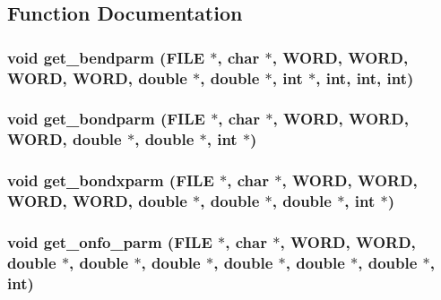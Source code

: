 \subsection{Function Documentation}
\subsubsection{\setlength{\rightskip}{0pt plus 5cm}void get\_\-bendparm (FILE $\ast$, char $\ast$, {\bf WORD}, {\bf WORD}, {\bf WORD}, {\bf WORD}, double $\ast$, double $\ast$, int $\ast$, int, int, int)}\label{thomas_2proto__input_8h_d1a60cb4dcaf05428bf12fd400393c24}


\subsubsection{\setlength{\rightskip}{0pt plus 5cm}void get\_\-bondparm (FILE $\ast$, char $\ast$, {\bf WORD}, {\bf WORD}, {\bf WORD}, double $\ast$, double $\ast$, int $\ast$)}\label{thomas_2proto__input_8h_e2f3fe34d49d48f8fea625df9d06766a}


\subsubsection{\setlength{\rightskip}{0pt plus 5cm}void get\_\-bondxparm (FILE $\ast$, char $\ast$, {\bf WORD}, {\bf WORD}, {\bf WORD}, {\bf WORD}, double $\ast$, double $\ast$, double $\ast$, int $\ast$)}\label{thomas_2proto__input_8h_4c20c39b2381ac59d1bb4acf0a4d9475}


\subsubsection{\setlength{\rightskip}{0pt plus 5cm}void get\_\-onfo\_\-parm (FILE $\ast$, char $\ast$, {\bf WORD}, {\bf WORD}, double $\ast$, double $\ast$, double $\ast$, double $\ast$, double $\ast$, double $\ast$, int)}\label{thomas_2proto__input_8h_8deea0cbdd1b1a2514de12514d534e30}


